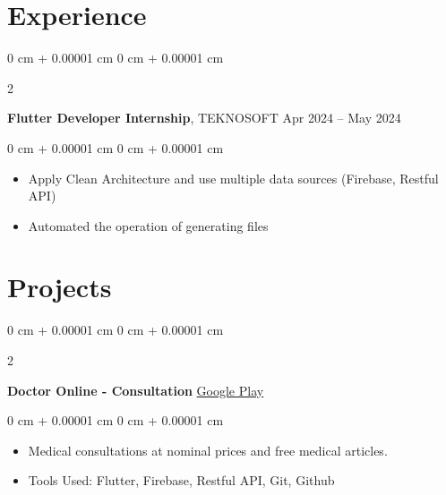 \documentclass[10pt, letterpaper]{article}
\newenvironment{highlights}{
    \begin{itemize}[
        topsep=0.10 cm,
        parsep=0.10 cm,
        partopsep=0pt,
        itemsep=0pt,
        leftmargin=0 cm + 10pt
    ]
}{
    \end{itemize}
} %
\newenvironment{onecolentry}{
    \begin{adjustwidth}{
        0 cm + 0.00001 cm
    }{
        0 cm + 0.00001 cm
    }
}{
    \end{adjustwidth}
} %
\newenvironment{twocolentry}[2][]{
    \onecolentry
    \def\secondColumn{#2}
    \setcolumnwidth{\fill, 4.5 cm}
    \begin{paracol}{2}
}{
    \switchcolumn \raggedleft \secondColumn
    \end{paracol}
    \endonecolentry
} %
\begin{document}
    
    \section{Experience}



        
        \begin{twocolentry}{
            Apr 2024 – May 2024
        }
            \textbf{Flutter Developer Internship}, TEKNOSOFT\end{twocolentry}

        \vspace{0.10 cm}
        \begin{onecolentry}
            \begin{highlights}
                \item Apply Clean Architecture and use multiple data sources (Firebase, Restful API)
                \item Automated the operation of generating files
                
            \end{highlights}
        \end{onecolentry}


        



    


    
    \section{Projects}



        
        \begin{twocolentry}{
            \href{https://play.google.com/store/apps/details?id=com.banna.doctoronline}{Google Play}
        }
            \textbf{Doctor Online - Consultation}\end{twocolentry}

        \vspace{0.10 cm}
        \begin{onecolentry}
            \begin{highlights}
                \item Medical consultations at nominal prices and free medical articles.
                \item Tools Used: Flutter, Firebase, Restful API, Git, Github
            \end{highlights}
        \end{onecolentry}
\end{document}
